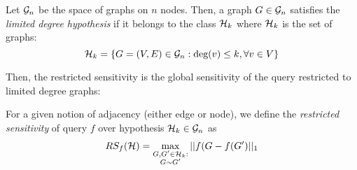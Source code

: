  \begin{definition}
 Let $\mathcal{G}_n$ be the space of graphs on $n$ nodes. Then, a graph $G \in \mathcal{G}_n$ satisfies the \emph{limited degree hypothesis} if it belongs to the class $\mathcal{H}_k$ where $\mathcal{H}_k$ is the set of graphs:
 $$\mathcal{H}_k = \{G = (V,E) \in \mathcal{G}_n : \text{deg}(v) \leq k, \forall v \in V \}$$
 \end{definition}
 
 Then, the restricted sensitivity is the global sensitivity of the query restricted to limited degree graphs:

\begin{definition}
\label{def:restricted-sensitivity}
For a given notion of adjacency (either edge or node), we define the \emph{restricted sensitivity} of query $f$ over hypothesis $\mathcal{H}_k \in \mathcal{G}_n$ as
$$RS_f(\mathcal{H}) =\max_{\substack{G, G'\in \mathcal{H}_k:\\ G\sim G'}} ||f(G - f(G')||_1$$
\end{definition}





